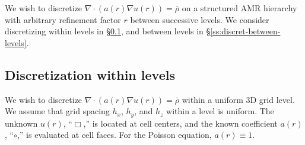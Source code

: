 \documentclass[10pt]{article}
\begin{document}
\newcommand{\indvar}{r}
 \newcommand{\uc}{u(\indvar)}

 \newcommand{\uxp}{u(\indvar+h_x)}
 \newcommand{\uxm}{u(\indvar-h_x)}
 \newcommand{\uxph}{u(\indvar+\frac{h_x}{2})}
 \newcommand{\uxmh}{u(\indvar-\frac{h_x}{2})}

 \newcommand{\uyp}{u(\indvar+h_y)}
 \newcommand{\uym}{u(\indvar-h_y)}
 \newcommand{\uyph}{u(\indvar+\frac{h_y}{2})}
 \newcommand{\uymh}{u(\indvar-\frac{h_y}{2})}

 \newcommand{\uzp}{u(\indvar+h_z)}
 \newcommand{\uzm}{u(\indvar-h_z)}
 \newcommand{\uzph}{u(\indvar+\frac{h_z}{2})}
 \newcommand{\uzmh}{u(\indvar-\frac{h_z}{2})}

 \newcommand{\ac}{a(\indvar)}
 \newcommand{\axph}{a(\indvar+\frac{h_x}{2})}
 \newcommand{\axmh}{a(\indvar-\frac{h_x}{2})}
 \newcommand{\ayph}{a(\indvar+\frac{h_y}{2})}
 \newcommand{\aymh}{a(\indvar-\frac{h_y}{2})}
 \newcommand{\azph}{a(\indvar+\frac{h_z}{2})}
 \newcommand{\azmh}{a(\indvar-\frac{h_z}{2})}

 \newcommand{\alc}{\alpha_{0}}
 \newcommand{\alxp}{\alpha_{x}}
 \newcommand{\alxm}{\alpha_{\bar{x}}}
 \newcommand{\alyp}{\alpha_{y}}
 \newcommand{\alym}{\alpha_{\bar{y}}}
 \newcommand{\alzp}{\alpha_{z}}
 \newcommand{\alzm}{\alpha_{\bar{z}}}

 \newcommand{\Uc}{U_{0}}
 \newcommand{\Uxp}{U_{x}}
 \newcommand{\Uxm}{U_{\bar{x}}}
 \newcommand{\Uyp}{U_{y}}
 \newcommand{\Uym}{U_{\bar{y}}}
 \newcommand{\Uzp}{U_{z}}
 \newcommand{\Uzm}{U_{\bar{z}}}

We wish to discretize $\nabla\cdot(\ac \nabla \uc) = \bar{\rho}$
on a structured AMR hierarchy with arbitrary refinement factor $r$
between successive levels.  We consider discretizing within levels in
\S\ref{ss:discret-within-levels}, and between
levels in \S\ref{ss:discret-between-levels}.

\subsection{Discretization within levels} \label{ss:discret-within-levels}

We wish to discretize $\nabla\cdot(\ac \nabla \uc) = \bar{\rho}$
within a uniform $3$D grid level.  We assume that grid spacing $h_x$,
$h_y$, and $h_z$ within a level is uniform.  The unknown $u(r)$, ``$\Box$,'' is
located at cell centers, and the known coefficient $a(r)$, ``$\circ$,'' is evaluated
at cell faces.  For the Poisson equation, $a(r)\equiv 1$.
\end{document}
